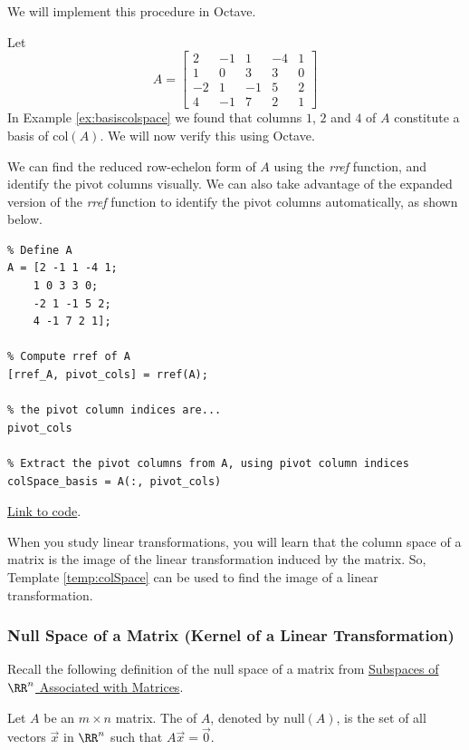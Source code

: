 \documentclass{ximera}
\begin{document}
We will implement this procedure in Octave.
 
\begin{template}\label{temp:colSpace}
Let $$A=\begin{bmatrix}2&-1&1&-4&1\\1&0&3&3&0\\-2&1&-1&5&2\\4&-1&7&2&1\end{bmatrix}$$
In Example \ref{ex:basiscolspace} we found that columns $1$, $2$ and $4$ of $A$ constitute a basis of $\text{col}(A)$.  We will now verify this using Octave.
 
We can find the reduced row-echelon form of $A$ using the \emph{rref} function, and identify the pivot columns visually.  We can also take advantage of the expanded version of the \emph{rref} function to identify the pivot columns automatically, as shown below.
 
\begin{verbatim}
% Define A
A = [2 -1 1 -4 1;
    1 0 3 3 0;
    -2 1 -1 5 2;
    4 -1 7 2 1];
 
% Compute rref of A
[rref_A, pivot_cols] = rref(A);
 
% the pivot column indices are...
pivot_cols
 
% Extract the pivot columns from A, using pivot column indices
colSpace_basis = A(:, pivot_cols)
\end{verbatim}
 
\href{https://sagecell.sagemath.org/?z=eJxtTkEKwjAQvAfyh7kULNhiqiIoHoL6Ao9SSq2JBmxTklR8vhssKOjuZWeGmdkEe6VNpyA5k9jiVCATEMgWEBvOQCMww5x2NuKsiLrAEsXILCJcgfiSGM4S7GzbD0HBOaVhdUw_xbuSU_TmYUPV2LsvqTCyE5mOvnBTbx2kD20H011Mozxqp_I85-xjfhsOz-DqJvwYPbSzLahu8Ka7_g3ljPCxrxtVnWtvPH0jJ-vvB9MX3FlRVA==&lang=octave&interacts=eJyLjgUAARUAuQ==}{Link to code}.
 
\end{template} 
 
When you study linear transformations, you will learn that the column space of a matrix is the image of the linear transformation induced by the matrix.  So, Template \ref{temp:colSpace} can be used to find the image of a linear transformation.
 
\subsubsection*{Null Space of a Matrix (Kernel of a Linear Transformation)}
 
Recall the following definition of the null space of a matrix from \href{https://ximera.osu.edu/linearalgebradzv3/LinearAlgebraInteractiveIntro/VSP-0040/main}{Subspaces of $\RR^n$ Associated with Matrices}.
\begin{definition}[\ref{def:nullspace}] Let $A$ be an $m\times n$ matrix.  The  of $A$, denoted by $\mbox{null}(A)$, is the set of all vectors $\vec{x}$ in $\RR^n$ such that $A\vec{x}=\vec{0}$.
\end{definition}
 
\end{document}
